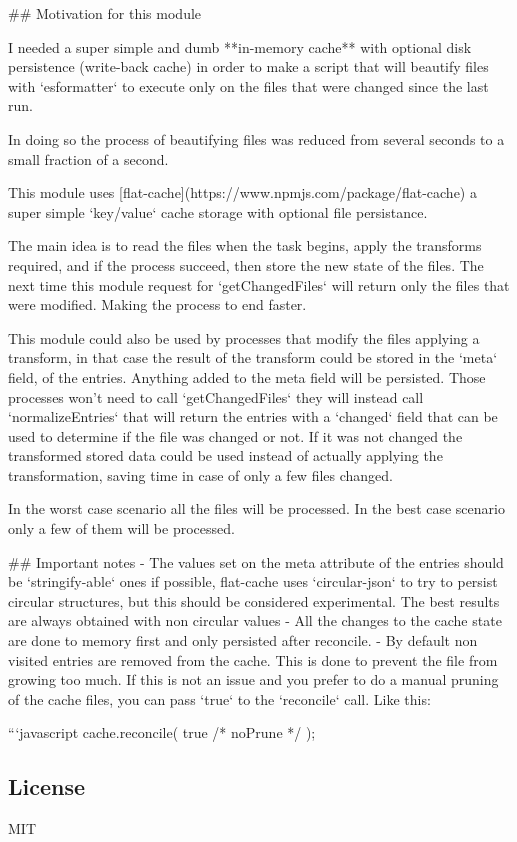 \begin{DoxyCode}
## Motivation for this module

I needed a super simple and dumb **in-memory cache** with optional disk persistence (write-back cache) in
       order to make
a script that will beautify files with `esformatter` to execute only on the files that were changed since
       the last run.

In doing so the process of beautifying files was reduced from several seconds to a small fraction of a
       second.

This module uses [flat-cache](https://www.npmjs.com/package/flat-cache) a super simple `key/value` cache
       storage with
optional file persistance.

The main idea is to read the files when the task begins, apply the transforms required, and if the process
       succeed,
then store the new state of the files. The next time this module request for `getChangedFiles` will return
       only
the files that were modified. Making the process to end faster.

This module could also be used by processes that modify the files applying a transform, in that case the
       result of the
transform could be stored in the `meta` field, of the entries. Anything added to the meta field will be
       persisted.
Those processes won't need to call `getChangedFiles` they will instead call `normalizeEntries` that will
       return the
entries with a `changed` field that can be used to determine if the file was changed or not. If it was not
       changed
the transformed stored data could be used instead of actually applying the transformation, saving time in
       case of only
a few files changed.

In the worst case scenario all the files will be processed. In the best case scenario only a few of them
       will be processed.

## Important notes
- The values set on the meta attribute of the entries should be `stringify-able` ones if possible,
       flat-cache uses `circular-json` to try to persist circular structures, but this should be considered experimental.
       The best results are always obtained with non circular values
- All the changes to the cache state are done to memory first and only persisted after reconcile.
- By default non visited entries are removed from the cache. This is done to prevent the file from growing
       too much. If this is not an issue and
  you prefer to do a manual pruning of the cache files, you can pass `true` to the `reconcile` call. Like
       this:

  ```javascript
  cache.reconcile( true /* noPrune */ );
\end{DoxyCode}


\subsection*{License}

M\+IT 
